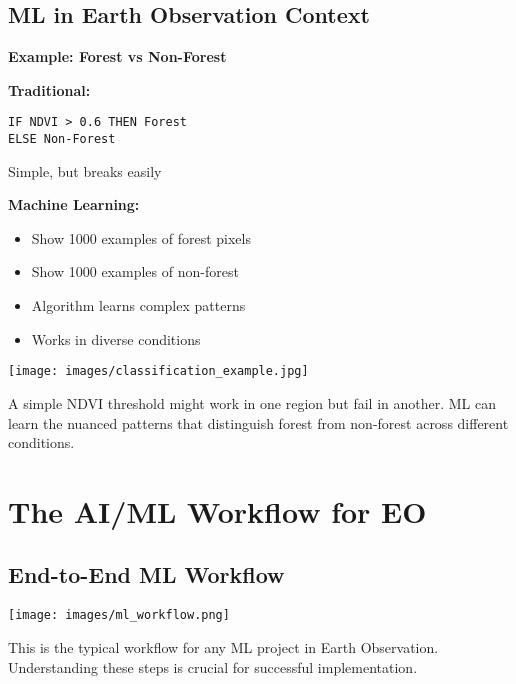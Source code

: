 \documentclass[
  letterpaper,
  DIV=11,
  numbers=noendperiod]{scrartcl}
\providecommand{\tightlist}{%
  \setlength{\itemsep}{0pt}\setlength{\parskip}{0pt}}
\begin{document}
\subsection{ML in Earth Observation
Context}\label{ml-in-earth-observation-context}

\textbf{Example: Forest vs Non-Forest}

\textbf{Traditional:}

\begin{verbatim}
IF NDVI > 0.6 THEN Forest
ELSE Non-Forest
\end{verbatim}

Simple, but breaks easily

\textbf{Machine Learning:}

\begin{itemize}
\tightlist
\item
  Show 1000 examples of forest pixels
\item
  Show 1000 examples of non-forest
\item
  Algorithm learns complex patterns
\item
  Works in diverse conditions
\end{itemize}

\begin{center}
\texttt{[image: images/classification\_example.jpg]}
\end{center}

A simple NDVI threshold might work in one region but fail in another. ML
can learn the nuanced patterns that distinguish forest from non-forest
across different conditions.

\section{The AI/ML Workflow for EO}\label{the-aiml-workflow-for-eo}

\subsection{End-to-End ML Workflow}\label{end-to-end-ml-workflow}

\begin{center}
\texttt{[image: images/ml\_workflow.png]}
\end{center}

This is the typical workflow for any ML project in Earth Observation.
Understanding these steps is crucial for successful implementation.
\end{document}
